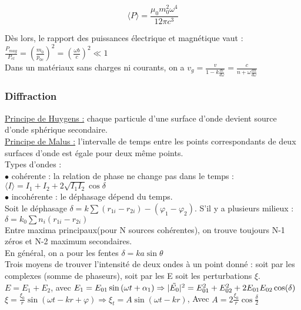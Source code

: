 \documentclass[../main.tex]{subfiles}
\begin{document}
\begin{equation}
    \langle P\rangle =  \frac{\mu_0 m_0^2 \omega^4}{12\pi c^3}
\end{equation}

Dès lors, le rapport des puissances électrique et magnétique vaut : \\
$\frac{P_{mag}}{P_{el}} = (\frac{m_0}{p_{0c}})^2 = (\frac{\omega b}{c})^2 \ll 1$\\

Dans un matériaux sans charges ni courants, on a $v_g = \frac{v}{1-k\frac{dv}{d\omega}} = \frac{c}{n+\omega \frac{dn}{d\omega}}$\\

\subsubsection{Diffraction}
\underline{Principe de Huygens :} chaque particule d'une surface d'onde devient source d'onde sphérique secondaire.\\
\underline{Principe de Malus :} l'intervalle de temps entre les points correspondants de deux surfaces d'onde est égale pour deux même points.\\

Types d'ondes : \\
$\bullet$ cohérente : la relation de phase ne change pas dans le temps : $\langle I\rangle = I_1 + I_2 + 2\sqrt{I_1I_2} \cos{\delta}$\\
$\bullet$ incohérente : le déphasage dépend du temps.\\

Soit le déphasage $\delta = k\sum (r_{1i}-r_{2i}) - (\varphi_1-\varphi_2)$. S'il y a plusieurs milieux : $\delta = k_0 \sum n_i (r_{1i}-r_{2i})$\\
\warning Entre maxima principaux(pour N sources cohérentes), on trouve toujours N-1 zéros et N-2 maximum secondaires.\\
\color{gray} En général, on a pour les fentes $\delta = ka\sin{\theta}$\color{black}\\

Trois moyens de trouver l'intensité de deux ondes à un point donné : soit par les complexes (somme de phaseurs), soit par les E soit les perturbations $\xi$.\\

$E = E_1+E_2$, avec $E_1 = E_{01} \sin{(\omega t+\alpha_1)} \Rightarrow \lvert \Tilde{E_0}\rvert^2 = E_{01}^2 + E_{02}^2 + 2E_{01}E_{02} \cos(\delta)$\\
$\xi = \frac{\xi_0}{r} \sin(\omega t - kr + \varphi) \Rightarrow \xi_t = A \sin{(\omega t -kr)}$, Avec $A = 2\frac{\xi_0}{r} \cos{\frac{\delta}{2}}$\\
\end{document}
